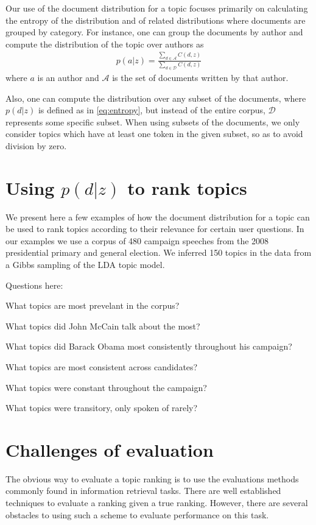 \documentclass{article}
\begin{document}
Our use of the document distribution for a topic focuses primarily on
calculating the entropy of the distribution and of related distributions where
documents are grouped by category.  For instance, one can group the documents
by author and compute the distribution of the topic over authors as
\begin{align}
  p(a|z) = \frac{\sum_{d \in \mathcal{A}} C(d,z)}{\sum_{d \in \mathcal{D}}
  C(d,z)}
\end{align}
where $a$ is an author and $\mathcal{A}$ is the set of documents written by
that author.

Also, one can compute the distribution over any subset of the documents, where
$p(d|z)$ is defined as in \eqref{eq:entropy}, but instead of the entire corpus,
$\mathcal{D}$ represents some specific subset.  When using subsets of the
documents, we only consider topics which have at least one token in the given
subset, so as to avoid division by zero.

\section{Using $p(d|z)$ to rank topics}
\label{sec:examples}

We present here a few examples of how the document distribution for a topic can
be used to rank topics according to their relevance for certain user questions.
In our examples we use a corpus of 480 campaign speeches from the 2008
presidential primary and general election.  We inferred 150 topics in the data
from a Gibbs sampling of the LDA topic model.

Questions here:

What topics are most prevelant in the corpus?

What topics did John McCain talk about the most?

What topics did Barack Obama most consistently throughout his campaign? 

What topics are most consistent across candidates?

What topics were constant throughout the campaign?

What topics were transitory, only spoken of rarely?


\section{Challenges of evaluation}
\label{sec:challenges}

The obvious way to evaluate a topic ranking is to use the evaluations methods
commonly found in information retrieval tasks.  There are well established
techniques to evaluate a ranking given a true ranking.  However, there are
several obstacles to using such a scheme to evaluate performance on this task.
\end{document}

